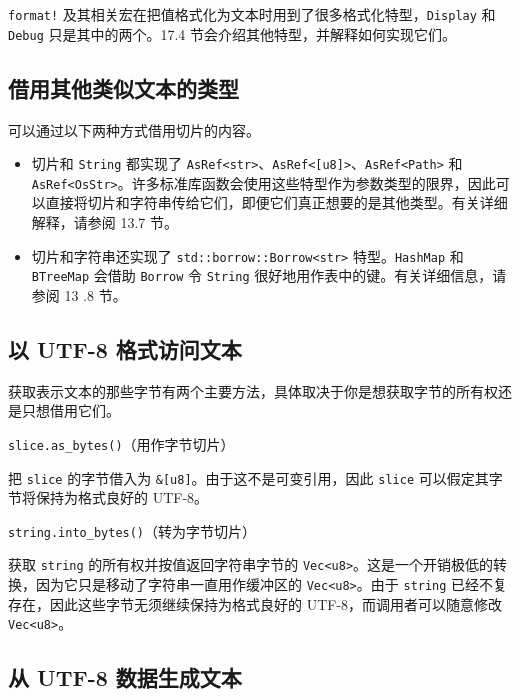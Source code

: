 \texttt{format!} 及其相关宏在把值格式化为文本时用到了很多格式化特型，\texttt{Display} 和 \texttt{Debug} 只是其中的两个。17.4 节会介绍其他特型，并解释如何实现它们。

\subsection{借用其他类似文本的类型}

可以通过以下两种方式借用切片的内容。

\begin{itemize}
\item 切片和 \texttt{String} 都实现了 \texttt{AsRef<str>}、\texttt{AsRef<[u8]>}、\texttt{AsRef<Path>} 和 \texttt{AsRef<OsStr>}。许多标准库函数会使用这些特型作为参数类型的限界，因此可以直接将切片和字符串传给它们，即便它们真正想要的是其他类型。有关详细解释，请参阅 13.7 节。
\item 切片和字符串还实现了 \texttt{std::borrow::Borrow<str>} 特型。\texttt{HashMap} 和 \texttt{BTreeMap} 会借助 \texttt{Borrow} 令 \texttt{String} 很好地用作表中的键。有关详细信息，请参阅 13 .8 节。
\end{itemize}

\subsection{以 UTF-8 格式访问文本}

获取表示文本的那些字节有两个主要方法，具体取决于你是想获取字节的所有权还是只想借用它们。

\begin{mySidenote}
\texttt{slice.as\_bytes()}（用作字节切片）
\end{mySidenote}

把 \texttt{slice} 的字节借入为 \texttt{\&[u8]}。由于这不是可变引用，因此 \texttt{slice} 可以假定其字节将保持为格式良好的 UTF-8。

\begin{mySidenote}
\texttt{string.into\_bytes()}（转为字节切片）
\end{mySidenote}

获取 \texttt{string} 的所有权并按值返回字符串字节的 \texttt{Vec<u8>}。这是一个开销极低的转换，因为它只是移动了字符串一直用作缓冲区的 \texttt{Vec<u8>}。由于 \texttt{string} 已经不复存在，因此这些字节无须继续保持为格式良好的 UTF-8，而调用者可以随意修改 \texttt{Vec<u8>}。

\subsection{从 UTF-8 数据生成文本}

